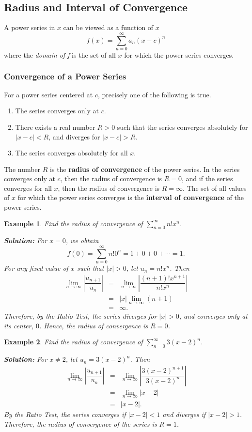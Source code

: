 \documentclass[titlepage,a4paper,12pt]{report}
\newtheorem{example}{Example}[section]
\begin{document}
\subsection{Radius and Interval of Convergence}
A power series in $x$ can be viewed as a function of $x$
\[f(x)=\sum _{n=0}^\infty a_n(x-c)^n\] where the \textit{domain of f} is the set of all $x$ for which the power series converges.

\subsubsection{Convergence of a Power Series}
For a power series centered at $c$, precisely one of the following is true.
\begin{enumerate}
\item The series converges only at $c$.
\item There exists a real number $R>0$ such that the series converges absolutely for $|x-c|<R$, and diverges for $|x-c|>R$.
\item The series converges absolutely for all $x$.
\end{enumerate}
The number $R$ is the \textbf{radius of convergence} of the power series. In the series converges only at $c$, then the radius of convergence is $R=0$, and if the series converges for all $x$, then the radius of convergence is $R=\infty$. The set of all values of $x$ for which the power series converges is the \textbf{interval of convergence} of the power series. 
\begin{example}
Find the radius of convergence of $\displaystyle \sum _{n=0}^\infty n!x^n$.

\noindent \textbf{Solution:} For $x=0$, we obtain 
\[f(0)=\sum _{n=0}^\infty n!0^n=1+0+0+\cdots =1.\] For any fixed value of $x$ such that $|x|>0$, let $u_n=n!x^n$. Then 
\begin{eqnarray*}
\lim _{n\rightarrow \infty} \left|\dfrac{u_{n+1}}{u_n}\right| &=& \lim _{n\rightarrow \infty}\left|\dfrac{(n+1)!x^{n+1}}{n!x^n}\right|\\
&=& |x| \lim _{n\rightarrow \infty} (n+1)\\
&=& \infty .
\end{eqnarray*}
Therefore, by the Ratio Test, the series diverges for $|x|>0$, and converges only at its center, $0$. Hence, the radius of convergence is $R=0$.
\end{example}
\begin{example}
Find the radius of convergence of $\displaystyle \sum _{n=0}^\infty 3(x-2)^n$.

\noindent \textbf{Solution:} For $x\neq 2$, let $u_n=3(x-2)^n$. Then 
\begin{eqnarray*}
\lim _{n\rightarrow \infty} \left|\dfrac{u_{n+1}}{u_n}\right| &=& \lim _{n\rightarrow \infty}\left|\dfrac{3(x-2)^{n+1}}{3(x-2)^n}\right|\\
&=& \lim _{n\rightarrow \infty} |x-2|\\
&=&|x-2|.
\end{eqnarray*}
By the Ratio Test, the series converges if $|x-2|<1$ and diverges if $|x-2|>1$. Therefore, the radius of convergence of the series is $R=1$. 
\end{example}
\end{document}

